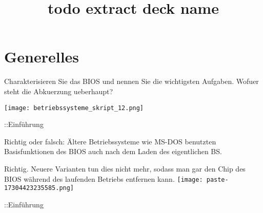 \documentclass{article}
\title{todo extract deck name}
\begin{document}
\section{Generelles}
\begin{tcolorbox}[colback=white!10!white,colframe=lightgray!75!black,
  savelowerto=\jobname_ex.tex]

\begin{center}
Charakterisieren Sie das BIOS und nennen Sie die wichtigsten Aufgaben. Wofuer steht die Abkuerzung ueberhaupt?

\end{center}

\tcblower

\justifying
\texttt{[image: betriebssysteme\_skript\_12.png]}

\end{tcolorbox}
\begin{tcolorbox}[colback=white!10!white,colframe=lightgray!75!black,
  savelowerto=\jobname_ex.tex]

\begin{center}
::Einführung

\end{center}

\tcblower

\justifying

\end{tcolorbox}
\begin{tcolorbox}[colback=white!10!white,colframe=lightgray!75!black,
  savelowerto=\jobname_ex.tex]

\begin{center}
Richtig oder falsch: Ältere Betriebssysteme wie MS-DOS benutzten Basisfunktionen des BIOS auch nach dem Laden des eigentlichen BS.

\end{center}

\tcblower

\justifying
Richtig. Neuere Varianten tun dies nicht mehr, sodass man gar den Chip des BIOS während des laufenden Betriebs entfernen kann.
\texttt{[image: paste-17304423235585.png]}

\end{tcolorbox}
\begin{tcolorbox}[colback=white!10!white,colframe=lightgray!75!black,
  savelowerto=\jobname_ex.tex]

\begin{center}
::Einführung

\end{center}

\tcblower

\justifying

\end{tcolorbox}
\end{document}
